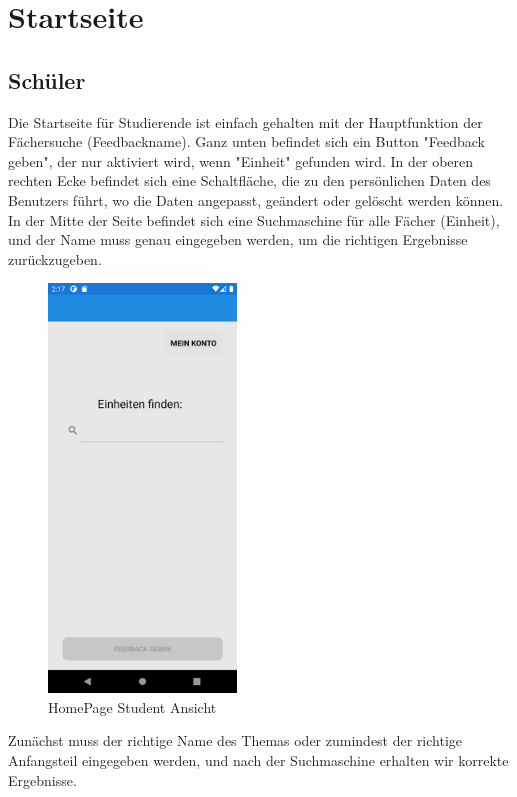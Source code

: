 \section{Startseite}
\subsection{Schüler}
Die Startseite für Studierende ist einfach gehalten mit der Hauptfunktion der Fächersuche (Feedbackname). Ganz unten befindet sich ein Button "Feedback geben", der nur aktiviert wird, wenn "Einheit" gefunden wird. In der oberen rechten Ecke befindet sich eine Schaltfläche, die zu den persönlichen Daten des Benutzers führt, wo die Daten angepasst, geändert oder gelöscht werden können. In der Mitte der Seite befindet sich eine Suchmaschine für alle Fächer (Einheit), und der Name muss genau eingegeben werden, um die richtigen Ergebnisse zurückzugeben.
\begin{figure}[h]
    \begin{center}
        \includegraphics*[width=5cm]{pics/Xamarin Student/7 HomePage Student.png}
        \caption[HomePage]{HomePage Student Ansicht}
    \end{center}
\end{figure}
\newpage
Zunächst muss der richtige Name des Themas oder zumindest der richtige Anfangsteil eingegeben werden, und nach der Suchmaschine erhalten wir korrekte Ergebnisse.
